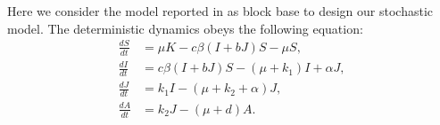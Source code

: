 Here we consider the model reported in \cite{Cai2009} as block base to
design our stochastic model. The deterministic dynamics obeys the following 
equation:
%
\begin{equation}
    \begin{aligned}
        \frac{dS}{dt} &=
            \mu K - c \beta (I + b J) S - \mu S,
            \\
        \frac{dI}{dt} &=
            c \beta (I + b J) S - (\mu + k_1)  I + \alpha J,
            \\
        \frac{dJ}{dt} &=
            k_1 I - (\mu + k_2 + \alpha) J,
            \\
        \frac{dA}{dt} &=
            k_2 J - (\mu + d) A.
    \end{aligned}
\end{equation}

